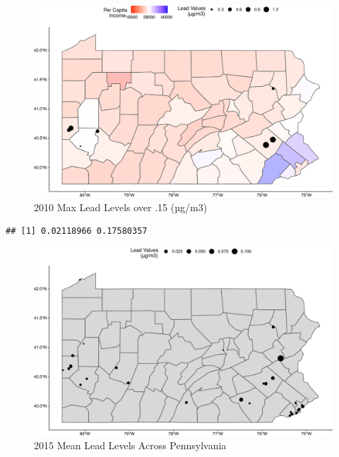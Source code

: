 \documentclass[
  12pt,
]{article}
\begin{document}
\begin{figure}

\includegraphics{Alcorn_Bao_Hermanson_ENV872_Project_files/figure-latex/spatial-analysis 2010.3-1} \hfill{}

\caption{2010 Max Lead Levels over .15 (µg/m3)}\label{fig:spatial-analysis 2010.3}
\end{figure}

\begin{verbatim}
## [1] 0.02118966 0.17580357
\end{verbatim}

\begin{figure}

\includegraphics{Alcorn_Bao_Hermanson_ENV872_Project_files/figure-latex/spatial analysis 2015.4-1} \hfill{}

\caption{2015 Mean Lead Levels Across Pennsylvania}\label{fig:spatial analysis 2015.4}
\end{figure}
\end{document}
